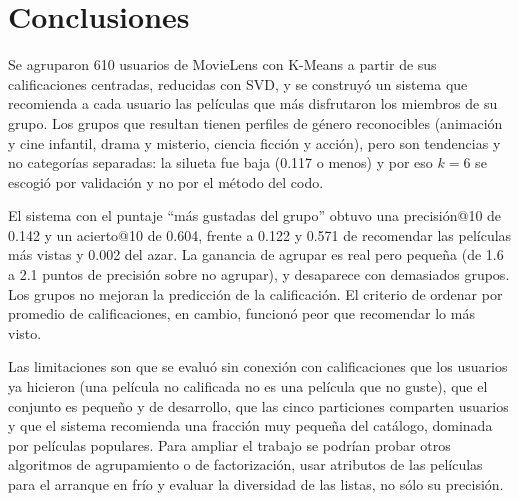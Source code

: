 \documentclass[11pt,letterpaper]{article}
\begin{document}
\section{Conclusiones}

Se agruparon 610 usuarios de MovieLens con K-Means a partir de sus calificaciones centradas, reducidas con SVD, y se construyó un sistema que recomienda a cada usuario las películas que más disfrutaron los miembros de su grupo. Los grupos que resultan tienen perfiles de género reconocibles (animación y cine infantil, drama y misterio, ciencia ficción y acción), pero son tendencias y no categorías separadas: la silueta fue baja (0.117 o menos) y por eso $k=6$ se escogió por validación y no por el método del codo.

El sistema con el puntaje ``más gustadas del grupo'' obtuvo una precisión@10 de 0.142 y un acierto@10 de 0.604, frente a 0.122 y 0.571 de recomendar las películas más vistas y 0.002 del azar. La ganancia de agrupar es real pero pequeña (de 1.6 a 2.1 puntos de precisión sobre no agrupar), y desaparece con demasiados grupos. Los grupos no mejoran la predicción de la calificación. El criterio de ordenar por promedio de calificaciones, en cambio, funcionó peor que recomendar lo más visto.

Las limitaciones son que se evaluó sin conexión con calificaciones que los usuarios ya hicieron (una película no calificada no es una película que no guste), que el conjunto es pequeño y de desarrollo, que las cinco particiones comparten usuarios y que el sistema recomienda una fracción muy pequeña del catálogo, dominada por películas populares. Para ampliar el trabajo se podrían probar otros algoritmos de agrupamiento o de factorización, usar atributos de las películas para el arranque en frío y evaluar la diversidad de las listas, no sólo su precisión.

\end{document}
